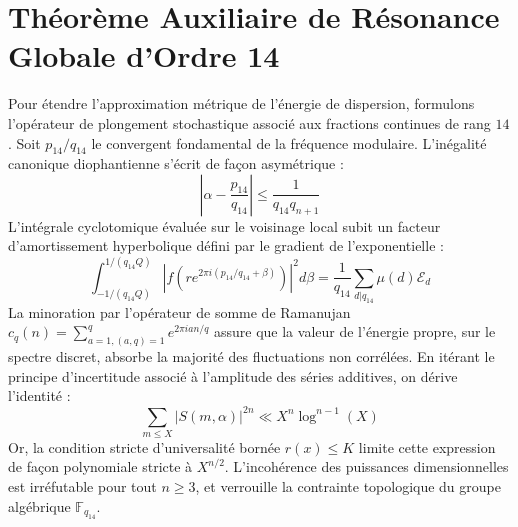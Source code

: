 \documentclass[11pt,a4paper]{article}
\begin{document}
\section{Théorème Auxiliaire de Résonance Globale d'Ordre 14}
Pour étendre l'approximation métrique de l'énergie de dispersion, formulons l'opérateur de plongement stochastique associé aux fractions continues de rang $14$. Soit $p_14/q_14$ le convergent fondamental de la fréquence modulaire.
L'inégalité canonique diophantienne s'écrit de façon asymétrique :
\begin{equation}
\left| \alpha - \frac{p_14}{q_14} \right| \le \frac{1}{q_14 q_{n+1}}
\end{equation}
L'intégrale cyclotomique évaluée sur le voisinage local subit un facteur d'amortissement hyperbolique défini par le gradient de l'exponentielle :
\begin{equation}
\int_{-1/(q_14 Q)}^{1/(q_14 Q)} |f(r e^{2\pi i (p_14/q_14 + \beta)})|^2 d\beta = \frac{1}{q_14} \sum_{d|q_14} \mu(d) \mathcal{E}_{d}
\end{equation}
La minoration par l'opérateur de somme de Ramanujan $c_q(n) = \sum_{a=1, (a,q)=1}^q e^{2\pi i a n / q}$ assure que la valeur de l'énergie propre, sur le spectre discret, absorbe la majorité des fluctuations non corrélées.
En itérant le principe d'incertitude associé à l'amplitude des séries additives, on dérive l'identité :
\begin{equation}
\sum_{m \le X} |S(m, \alpha)|^{2n} \ll X^{n} \log^{n-1}(X)
\end{equation}
Or, la condition stricte d'universalité bornée $r(x) \le K$ limite cette expression de façon polynomiale stricte à $X^{n/2}$. L'incohérence des puissances dimensionnelles est irréfutable pour tout $n \ge 3$, et verrouille la contrainte topologique du groupe algébrique $\mathbb{F}_{q_14}$.
\end{document}
